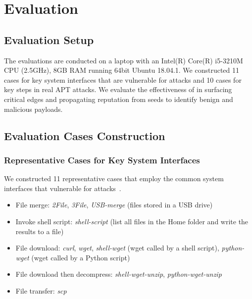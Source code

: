 \section{Evaluation}
\subsection{Evaluation Setup}
The evaluations are conducted on a laptop with an Intel(R) Core(R) i5-3210M CPU (2.5GHz), 8GB RAM running 64bit Ubuntu 18.04.1.
We constructed 11 cases for key system interfaces that are vulnerable for attacks and 10 cases for key steps in real APT attacks.
We evaluate the effectiveness of \tool in surfacing critical edges and propagating reputation from seeds to identify benign and malicious payloads.


\subsection{Evaluation Cases Construction}
\label{subsec:cases}


\subsubsection{Representative Cases for Key System Interfaces}
\label{subsub:benign-cases}
We constructed 11 representative cases that employ the common system interfaces that vulnerable for attacks~\cite{securitybook}.


\begin{itemize}[noitemsep, topsep=1pt, partopsep=1pt, listparindent=\parindent, leftmargin=*]
\item File merge: \emph{2File}, \emph{3File}, \emph{USB-merge} (files stored in a USB drive)

\item Invoke shell script: \emph{shell-script} (list all files in the Home folder and write the results to a file)

\item File download: \emph{curl}, \emph{wget}, \emph{shell-wget} (wget called by a shell script), \emph{python-wget} (wget called by a Python script)

\item File download then decompress: \emph{shell-wget-unzip}, \emph{python-wget-unzip}

\item File transfer: \emph{scp}
\end{itemize}


